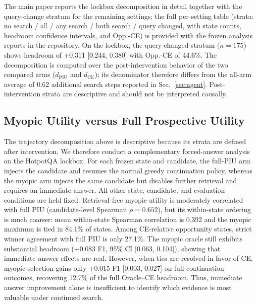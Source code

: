 \documentclass[10pt]{article}
\begin{document}
The main paper reports the lockbox decomposition in detail together with the
query-change stratum for the remaining settings; the full per-setting table
(strata: no search / all / any search / both search / query changed, with
state counts, headroom confidence intervals, and Opp.-CE) is provided with
the frozen analysis reports in the repository. On the lockbox, the
query-changed stratum ($n=175$) shows headroom of +0.311 [0.244, 0.380] with
Opp.-CE of 44.6\%. The decomposition is computed over the post-intervention
behavior of the two compared arms ($d_{\mathrm{PIU}}$ and $d_{\mathrm{CE}}$);
its denominator therefore differs from the all-arm average of 0.62
additional search steps reported in Sec.~\ref{sec:agent}. Post-intervention
strata are descriptive and should not be interpreted causally.

\subsection{Myopic Utility versus Full Prospective Utility}
\label{sec:myopic}

The trajectory decomposition above is descriptive because its strata are
defined after intervention. We therefore conduct a complementary
forced-answer analysis on the HotpotQA lockbox. For each frozen state and
candidate, the full-PIU arm injects the candidate and resumes the normal
greedy continuation policy, whereas the myopic arm injects the same
candidate but disables further retrieval and requires an immediate answer.
All other state, candidate, and evaluation conditions are held fixed.
Retrieval-free myopic utility is moderately correlated with full PIU
(candidate-level Spearman $\rho=0.652$), but its within-state ordering is
much coarser: mean within-state Spearman correlation is 0.392 and the
myopic maximum is tied in 84.1\% of states. Among CE-relative opportunity
states, strict winner agreement with full PIU is only 27.1\%. The myopic
oracle still exhibits substantial headroom (+0.083 F1, 95\% CI
[0.063, 0.104]), showing that immediate answer effects are real. However,
when ties are resolved in favor of CE, myopic selection gains only +0.015 F1
[0.003, 0.027] on full-continuation outcomes, recovering 12.7\% of the full
Oracle--CE headroom. Thus, immediate answer improvement alone is
insufficient to identify which evidence is most valuable under continued
search.
\end{document}
